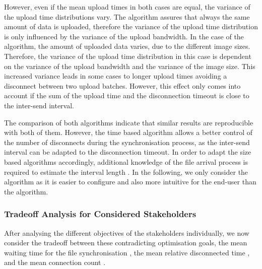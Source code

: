 However, even if the mean upload times in both cases are equal, the variance of the upload time distributions vary.
The \algosize algorithm assures that always the same amount of data is uploaded, therefore the variance of the upload time distribution is only influenced by the variance of the upload bandwidth.
In the case of the \algointerval algorithm, the amount of uploaded data varies, due to the different image sizes.
Therefore, the variance of the upload time distribution in this case is dependent on the variance of the upload bandwidth and the variance of the image size.
This increased variance leads in some cases to longer upload times avoiding a disconnect between two upload batches.
However, this effect only comes into account if the sum of the upload time and the disconnection timeout is close to the inter-send interval.

The comparison of both algorithms indicate that similar results are reproducible with both of them.
However, the time based algorithm allows a better control of the number of disconnects during the synchronisation process, as the inter-send interval can be adapted to the disconnection timeout. 
In order to adapt the size based algorithms accordingly, additional knowledge of the file arrival process is required to estimate the interval length \thresholdInterval.
In the following, we only consider the \algointerval algorithm as it is easier to configure and also more intuitive for the end-user than the \algosize algorithm. 

\subsubsection*{Tradeoff Analysis for Considered Stakeholders}\label{sec:application:cloud_file_synchronisation:numerical_evaluation:trade_off_analysis}

After analysing the different objectives of the stakeholders individually, we now consider the tradeoff between these contradicting optimisation goals, the mean waiting time for the file synchronisation \sojournTime, the mean relative disconnected time \relativeDisconnectedTime, and the mean connection count \connectionCount.

